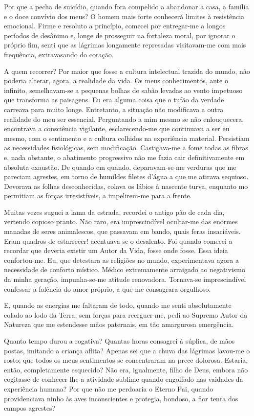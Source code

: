 \documentclass[portuguese,12pt,a4paper]{scrbook}
\begin{document}
	Por que a pecha de suicídio, quando fora compelido a abandonar a casa, a família e o doce convívio dos meus? O homem mais forte conhecerá limites à resistência emocional. Firme e resoluto a princípio, comecei por entregar-me a longos períodos de desânimo e, longe de prosseguir na fortaleza moral, por ignorar o próprio fim, senti que as lágrimas longamente represadas visitavam-me com mais frequência, extravasando do coração.
	
	A quem recorrer? Por maior que fosse a cultura intelectual trazida do mundo, não poderia alterar, agora, a realidade da vida. Os meus conhecimentos, ante o infinito, semelhavam-se a pequenas bolhas de sabão levadas ao vento impetuoso que transforma as paisagens. Eu era alguma coisa que o tufão da verdade carreava para muito longe. Entretanto, a situação não modificava a outra realidade do meu ser essencial. Perguntando a mim mesmo se não enlouquecera, encontrava a consciência vigilante, esclarecendo-me que continuava a ser eu mesmo, com o sentimento e a cultura colhidos na experiência material. Persistiam as necessidades fisiológicas, sem modificação. Castigava-me a fome todas as fibras e, nada obstante, o abatimento progressivo não me fazia cair definitivamente em absoluta exaustão. De quando em quando, deparavam-se-me verduras que me pareciam agrestes, em torno de humildes filetes d'água a que me atirava sequioso. Devorava as folhas desconhecidas, colava os lábios à nascente turva, enquanto mo permitiam as forças irresistíveis, a impelirem-me para a frente.
	
	Muitas vezes suguei a lama da estrada, recordei o antigo pão de cada dia, vertendo copioso pranto. Não raro, era imprescindível ocultar-me das enormes manadas de seres animalescos, que passavam em bando, quais feras insaciáveis. Eram quadros de estarrecer! acentuava-se o desalento. Foi quando comecei a recordar que deveria existir um Autor da Vida, fosse onde fosse. Essa ideia confortou-me. Eu, que detestara as religiões no mundo, experimentava agora a necessidade de conforto místico. Médico extremamente arraigado ao negativismo da minha geração, impunha-se-me atitude renovadora. Tornava-se imprescindível confessar a falência do amor-próprio, a que me consagrara orgulhoso.
	
	E, quando as energias me faltaram de todo, quando me senti absolutamente colado ao lodo da Terra, sem forças para reerguer-me, pedi ao Supremo Autor da Natureza que me estendesse mãos paternais, em tão amargurosa emergência.
	
	Quanto tempo durou a rogativa? Quantas horas consagrei à súplica, de mãos postas, imitando a criança aflita? Apenas sei que a chuva das lágrimas lavou-me o rosto; que todos os meus sentimentos se concentraram na prece dolorosa. Estaria, então, completamente esquecido? Não era, igualmente, filho de Deus, embora não cogitasse de conhecer-lhe a atividade sublime quando engolfado nas vaidades da experiência humana? Por que não me perdoaria o Eterno Pai, quando providenciava ninho às aves inconscientes e protegia, bondoso, a flor tenra dos campos agrestes?
	
\end{document}
